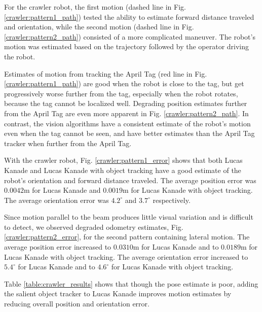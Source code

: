 \documentclass[letterpaper, 10 pt, conference]{ieeeconf}
\begin{document}
For the crawler robot, the first motion (dashed line in Fig. \ref{crawler:pattern1_path}) tested the ability to estimate forward distance traveled and orientation, while the second motion  (dashed line in Fig. \ref{crawler:pattern2_path}) consisted of a more complicated maneuver. The robot's motion was estimated based on the trajectory followed by the operator driving the robot.

Estimates of motion from tracking the April Tag (red line in Fig. \ref{crawler:pattern1_path}) are good when the robot is close to the tag, but get progressively worse further from the tag, especially when the robot rotates, because the tag cannot be localized well. Degrading position estimates further from the April Tag are even more apparent in Fig. \ref{crawler:pattern2_path}. In contrast, the vision algorithms have a consistent estimate of the robot's motion even when the tag cannot be seen, and have better estimates than the April Tag tracker when further from the April Tag. 

With the crawler robot, Fig. \ref{crawler:pattern1_error} shows that both Lucas Kanade and Lucas Kanade with object tracking have a good estimate of the robot's orientation and forward distance traveled. The average position error was $0.0042$m for Lucas Kanade and $0.0019$m for Lucas Kanade with object tracking. The average orientation error was $4.2^{\circ}$ and $3.7^{\circ}$ respectively. 

Since motion parallel to the beam produces little visual variation and is difficult to detect, we observed degraded odometry estimates, Fig. \ref{crawler:pattern2_error}, for the second pattern containing lateral motion. The average position error increased to $0.0310$m for Lucas Kanade and to $0.0189$m for Lucas Kanade with object tracking. The average orientation error increased to $5.4^{\circ}$ for Lucas Kanade and to $4.6^{\circ}$ for Lucas Kanade with object tracking.

Table \ref{table:crawler_results} shows that though the pose estimate is poor, adding the salient object tracker to Lucas Kanade improves motion estimates by reducing overall position and orientation error.
\end{document}
